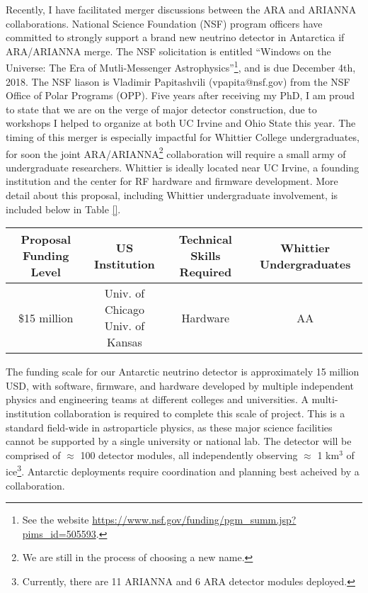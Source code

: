 \documentclass[../../main.tex]{subfiles}
\begin{document}
Recently, I have facilitated merger discussions between the ARA and ARIANNA collaborations.  National Science Foundation (NSF) program officers have committed to strongly support a brand new neutrino detector in Antarctica if ARA/ARIANNA merge.  The NSF solicitation is entitled ``Windows on the Universe: The Era of Mutli-Messenger Astrophysics''\footnote{See the website \url{https://www.nsf.gov/funding/pgm_summ.jsp?pims_id=505593}.}, and is due December 4th, 2018.  The NSF liason is Vladimir Papitashvili (vpapita@nsf.gov) from the NSF Office of Polar Programs (OPP).  Five years after receiving my PhD, I am proud to state that we are on the verge of major detector construction, due to workshops I helped to organize at both UC Irvine and Ohio State this year.  The timing of this merger is especially impactful for Whittier College undergraduates, for soon the joint ARA/ARIANNA\footnote{We are still in the process of choosing a new name.} collaboration will require a small army of undergraduate researchers. Whittier is ideally located near UC Irvine, a founding institution and the center for RF hardware and firmware development.  More detail about this proposal, including Whittier undergraduate involvement, is included below in Table \ref{}. \\ \hspace{0.1cm}

\begin{table}
\centering
\begin{tabular}{|c|c|c|c|}
\hline
Proposal Funding Level & US Institution & Technical Skills Required & Whittier Undergraduates \\ \hline \hline
\$15 million & \makecell{Univ. of Chicago \\ Univ. of Kansas} & Hardware & AA \\
\end{tabular}
\end{table}

The funding scale for our Antarctic neutrino detector is approximately 15 million USD, with software, firmware, and hardware developed by multiple independent physics and engineering teams at different colleges and universities.  A multi-institution collaboration is required to complete this scale of project.  This is a standard field-wide in astroparticle physics, as these major science facilities cannot be supported by a single university or national lab.  The detector will be comprised of $\approx$ 100 detector modules, all independently observing $\approx$ 1 km$^3$ of ice\footnote{Currently, there are 11 ARIANNA and 6 ARA detector modules deployed.}.  Antarctic deployments require coordination and planning best acheived by a collaboration. \\ \hspace{0.1cm}
\end{document}
